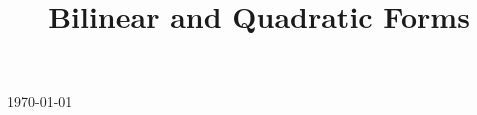 

\title{Bilinear and Quadratic Forms}

\usepackage[sort=standard]{glossaries} 
\makeglossaries



\maketitle
\centerline{\today}
\tableofcontents







